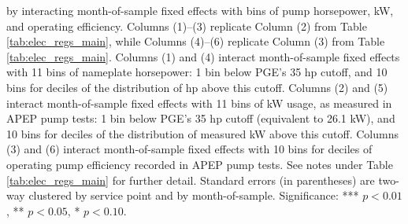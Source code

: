 \begin{table}[t!]
{by interacting month-of-sample fixed effects with bins of pump horsepower, kW, and operating efficiency.  
Columns (1)--(3) replicate Column (2) from Table \ref{tab:elec_regs_main}, while Columns (4)--(6) replicate Column (3) from Table \ref{tab:elec_regs_main}.
Columns (1) and (4) interact month-of-sample fixed effects with 11 bins of nameplate horsepower: 1 bin below PGE's 35 hp cutoff, 
 and 10 bins for deciles of the distribution of hp above this cutoff.  
Columns (2) and (5) interact month-of-sample fixed effects with 11 bins of kW usage, as measured in APEP pump tests:  
1 bin below PGE's 35 hp cutoff (equivalent to 26.1 kW), and 10 bins for deciles of the distribution of measured kW above this cutoff.  
Columns (3) and (6) interact month-of-sample fixed effects with 10 bins for deciles of operating pump efficiency recorded in APEP pump tests. 
See notes under Table \ref{tab:elec_regs_main} for further detail. 
Standard errors (in parentheses) are two-way clustered by service point and by month-of-sample.
Significance: *** $p < 0.01$, ** $p < 0.05$, * $p < 0.10$.
}
\end{table}

